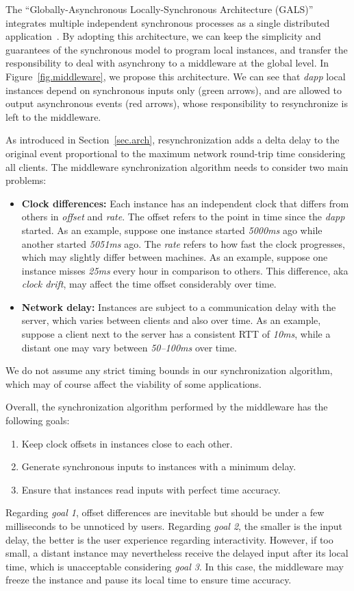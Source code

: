 \documentclass[sigplan,screen]{acmart}
\newcommand{\dapp}{\emph{dapp}\xspace}
\begin{document}
The ``Globally-Asynchronous Locally-Synchronous Architecture (GALS)''
integrates multiple independent synchronous processes as a single distributed
application~\cite{TODO}.
%
By adopting this architecture, we can keep the simplicity and guarantees of the
synchronous model to program local instances, and transfer the responsibility
to deal with asynchrony to a middleware at the global level.
%
In Figure~\ref{fig.middleware}, we propose this architecture.
We can see that \dapp local instances depend on synchronous inputs only (green
arrows), and are allowed to output asynchronous events (red arrows), whose
responsibility to resynchronize is left to the middleware.

As introduced in Section~\ref{sec.arch}, resynchronization adds a delta delay
to the original event proportional to the maximum network round-trip time
considering all clients.
The middleware synchronization algorithm needs to consider two main problems:
%
\begin{itemize}
\item \textbf{Clock differences:}
    Each instance has an independent clock that differs from others in
    \emph{offset} and \emph{rate}.
    The offset refers to the point in time since the \dapp started.
    As an example, suppose one instance started \emph{5000ms} ago while another
    started \emph{5051ms} ago.
    The \emph{rate} refers to how fast the clock progresses, which may
    slightly differ between machines.
    As an example, suppose one instance misses \emph{25ms} every hour in
    comparison to others.
    This difference, aka \emph{clock drift}, may affect the time offset
    considerably over time.
\item \textbf{Network delay:}
    Instances are subject to a communication delay with the server, which
    varies between clients and also over time.
    As an example, suppose a client next to the server has a consistent RTT of
    \emph{10ms}, while a distant one may vary between \emph{50--100ms} over
    time.
\end{itemize}
%
We do not assume any strict timing bounds in our synchronization algorithm,
which may of course affect the viability of some applications.

Overall, the synchronization algorithm performed by the middleware has the
following goals:
%
\begin{enumerate}
\item Keep clock offsets in instances close to each other.
\item Generate synchronous inputs to instances with a minimum delay.
\item Ensure that instances read inputs with perfect time accuracy.
\end{enumerate}
%
Regarding \emph{goal 1}, offset differences are inevitable but should be under
a few milliseconds to be unnoticed by users.
Regarding \emph{goal 2}, the smaller is the input delay, the better is the user
experience regarding interactivity.
However, if too small, a distant instance may nevertheless receive the delayed
input after its local time, which is unacceptable considering \emph{goal 3}.
In this case, the middleware may freeze the instance and pause its local time
to ensure time accuracy.
\end{document}
